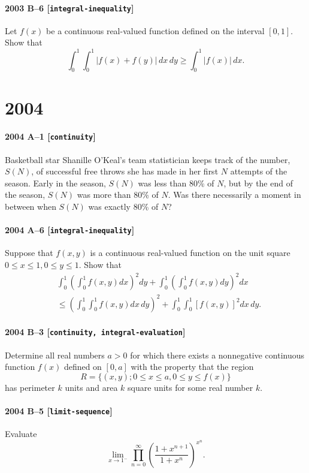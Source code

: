 \documentclass[11pt]{article}
\begin{document}
\paragraph{2003 B--6 \textnormal{[\texttt{integral-inequality}]}}
Let $f(x)$ be a continuous real-valued function defined on the interval
$[0,1]$. Show that
\[
   \int_0^1 \int_0^1 | f(x) + f(y) |\,dx\,dy \geq \int_0^1 |f(x)|\,dx.
\]

\section*{2004}

\paragraph{2004 A--1 \textnormal{[\texttt{continuity}]}}
Basketball star Shanille O'Keal's team statistician
keeps track of the number, $S(N)$, of successful free throws she has made
in her first $N$ attempts of the season.
Early in the season, $S(N)$  was less than 80\% of $N$,
but by the end of the season, $S(N)$ was more than 80\% of $N$.
Was there necessarily a moment in between when $S(N)$ was exactly 80\% of $N$?

\paragraph{2004 A--6 \textnormal{[\texttt{integral-inequality}]}}
Suppose that $f(x,y)$ is a continuous real-valued function on the unit
square $0 \le x \le 1, 0 \le y \le 1$. Show that
\begin{align*}
& \int_0^1 \left( \int_0^1  f(x,y) dx \right)^2 dy +
 \int_0^1 \left( \int_0^1  f(x,y) dy \right)^2 dx \\
&\leq
\left( \int_0^1 \int_0^1  f(x,y) dx\, dy \right)^2 +
\int_0^1 \int_0^1 \left[ f(x,y) \right]^2 dx\,dy.
\end{align*}

\paragraph{2004 B--3 \textnormal{[\texttt{continuity, integral-evaluation}]}}
Determine all real numbers $a > 0$ for which there exists a nonnegative
continuous function $f(x)$ defined on $[0,a]$ with the property that the
region
\[
R = \{ (x,y) ; 0 \le x \le a, 0 \le y \le f(x) \}
\]
has perimeter $k$ units and area $k$ square units for some real number $k$.

\paragraph{2004 B--5 \textnormal{[\texttt{limit-sequence}]}}
Evaluate
\[
\lim_{x \to 1^-} \prod_{n=0}^\infty \left(\frac{1 + x^{n+1}}{1 +
x^n}\right)^{x^n}.
\]
\end{document}
